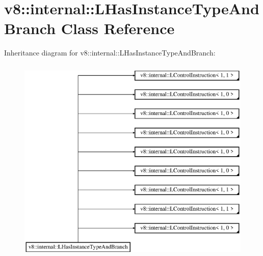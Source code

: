 \hypertarget{classv8_1_1internal_1_1_l_has_instance_type_and_branch}{}\section{v8\+:\+:internal\+:\+:L\+Has\+Instance\+Type\+And\+Branch Class Reference}
\label{classv8_1_1internal_1_1_l_has_instance_type_and_branch}
Inheritance diagram for v8\+:\+:internal\+:\+:L\+Has\+Instance\+Type\+And\+Branch\+:\begin{figure}[H]
\begin{center}
\leavevmode
\includegraphics[height=10.000000cm]{classv8_1_1internal_1_1_l_has_instance_type_and_branch}
\end{center}
\end{figure}
